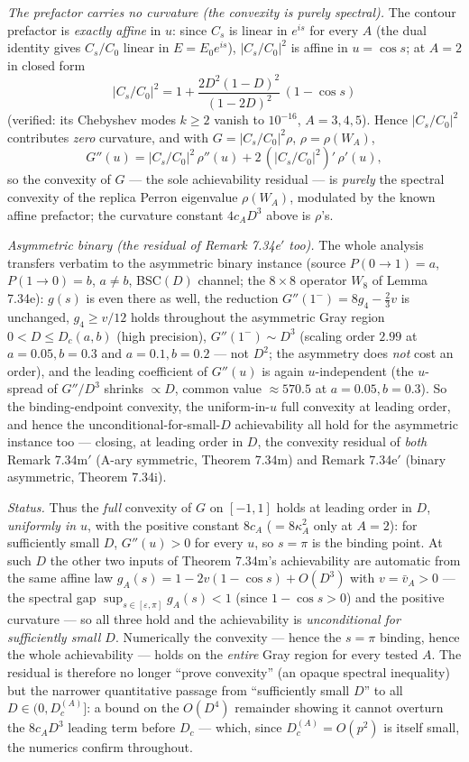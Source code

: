 \documentclass[
]{article}
\begin{document}
\emph{The prefactor carries no curvature (the convexity is purely spectral).}
The contour prefactor is \emph{exactly affine} in $u$: since $C_s$ is linear in
$e^{is}$ for every $A$ (the dual identity gives $C_s/C_0$ linear in $E=E_0e^{is}$),
$|C_s/C_0|^2$ is affine in $u=\cos s$; at $A=2$ in closed form
\[
  |C_s/C_0|^2=1+\frac{2D^2(1-D)^2}{(1-2D)^2}\,(1-\cos s)
\]
(verified: its Chebyshev modes $k\ge2$ vanish to $10^{-16}$, $A=3,4,5$). Hence
$|C_s/C_0|^2$ contributes \emph{zero} curvature, and with $G=|C_s/C_0|^2\rho$,
$\rho=\rho(W_A)$,
\[
  G''(u)=|C_s/C_0|^2\,\rho''(u)+2\,(|C_s/C_0|^2)'\,\rho'(u),
\]
so the convexity of $G$ --- the sole achievability residual --- is \emph{purely}
the spectral convexity of the replica Perron eigenvalue $\rho(W_A)$, modulated by
the known affine prefactor; the curvature constant $4c_A D^3$ above is
$\rho$'s.

\emph{Asymmetric binary (the residual of Remark 7.34e$'$ too).} The whole
analysis transfers verbatim to the asymmetric binary instance (source
$P(0\!\to\!1)=a$, $P(1\!\to\!0)=b$, $a\ne b$, BSC$(D)$ channel; the $8\times8$
operator $W_8$ of Lemma 7.34e): $g(s)$ is even there as well, the reduction
$G''(1^-)=8g_4-\tfrac23 v$ is unchanged, $g_4\ge v/12$ holds throughout the
asymmetric Gray region $0<D\le D_c(a,b)$ (high precision), $G''(1^-)\sim D^3$
(scaling order $2.99$ at $a=0.05,b=0.3$ and $a=0.1,b=0.2$ --- not $D^2$; the
asymmetry does \emph{not} cost an order), and the leading coefficient of
$G''(u)$ is again $u$-independent (the $u$-spread of $G''/D^3$ shrinks $\propto D$,
common value $\approx570.5$ at $a=0.05,b=0.3$). So the binding-endpoint
convexity, the uniform-in-$u$ full convexity at leading order, and hence the
unconditional-for-small-$D$ achievability all hold for the asymmetric instance
too --- closing, at leading order in $D$, the convexity residual of \emph{both}
Remark 7.34m$'$ (A-ary symmetric, Theorem 7.34m) and Remark 7.34e$'$ (binary
asymmetric, Theorem 7.34i).

\emph{Status.} Thus the \emph{full} convexity of $G$ on $[-1,1]$ holds at leading
order in $D$, \emph{uniformly in $u$}, with the positive constant $8c_A$
($=8\kappa_A^2$ only at $A=2$): for sufficiently small $D$, $G''(u)>0$ for every $u$, so
$s=\pi$ is the binding point. At such $D$ the other two inputs of Theorem 7.34m's
achievability are automatic from the same affine law $g_A(s)=1-2v(1-\cos s)
+O(D^3)$ with $v=\bar v_A>0$ --- the spectral gap $\sup_{s\in[\varepsilon,\pi]}
g_A(s)<1$ (since $1-\cos s>0$) and the positive curvature --- so all three hold
and the achievability is \emph{unconditional for sufficiently small $D$}.
Numerically the convexity ---
hence the $s=\pi$ binding, hence the whole achievability --- holds on the
\emph{entire} Gray region for every tested $A$. The residual is therefore no
longer ``prove convexity'' (an opaque spectral inequality) but the narrower
quantitative passage from ``sufficiently small $D$'' to all $D\in(0,D_c^{(A)}]$:
a bound on the $O(D^4)$ remainder showing it cannot overturn the $8c_A D^3$
leading term before $D_c$ --- which, since $D_c^{(A)}=O(p^2)$ is itself small, the
numerics confirm throughout.
\end{document}
